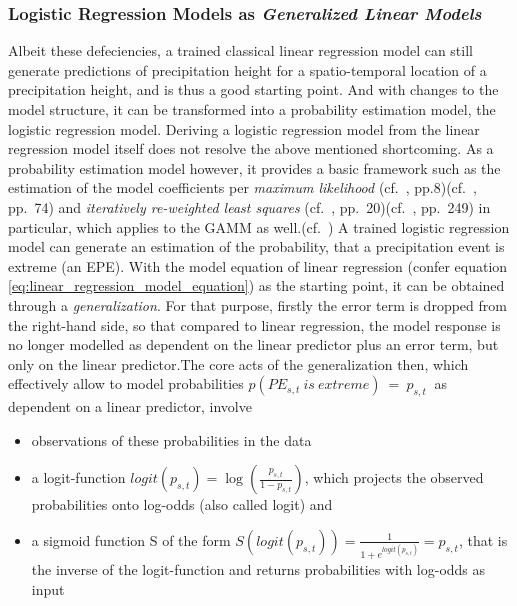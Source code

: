 \documentclass[
  12pt,
]{article}
\begin{document}
\endgroup

\hypertarget{logistic-regression-models-as}{%
\subsubsection{\texorpdfstring{Logistic Regression Models as
\textit{Generalized Linear Models}}{Logistic Regression Models as }}\label{logistic-regression-models-as}}

\begingroup
\justify

Albeit these defeciencies, a trained classical linear regression model
can still generate predictions of precipitation height for a
spatio-temporal location of a precipitation height, and is thus a good
starting point. And with changes to the model structure, it can be
transformed into a probability estimation model, the logistic regression
model. Deriving a logistic regression model from the linear regression
model itself does not resolve the above mentioned shortcoming. As a
probability estimation model however, it provides a basic framework such
as the estimation of the model coefficients per
\textit{maximum likelihood} (cf.~\cite{Hosmer.2013},
pp.8)(cf.~\cite{Wood.2017}, pp.~74) and
\textit{iteratively re-weighted least squares} (cf.~\cite{Hosmer.2013},
pp.~20)(cf.~\cite{Wood.2017}, pp.~249) in particular, which applies to
the GAMM as well.\newline (cf.~\cite{Hosmer.2013}) A trained logistic
regression model can generate an estimation of the probability, that a
precipitation event is extreme (an EPE). With the model equation of
linear regression (confer equation
\ref{eq:linear_regression_model_equation}) as the starting point, it can
be obtained through a \textit{generalization}. For that purpose, firstly
the error term is dropped from the right-hand side, so that compared to
linear regression, the model response is no longer modelled as dependent
on the linear predictor plus an error term, but only on the linear
predictor.\newline The core acts of the generalization then, which
effectively allow to model probabilities
\(p(PE_{s,t}\:is\:extreme)\:=\:p_{s,t}\:\) as dependent on a linear
predictor, involve\newline \endgroup \vspace{-0.75cm}

\begin{itemize}
\item observations of these probabilities in the data
\item a logit-function $logit(p_{s,t}) = \log\left(\frac{p_{s,t}}{1-p_{s,t}}\right)$, which projects the observed probabilities onto log-odds (also called logit) and
\item a sigmoid function S of the form $S\left(logit(p_{s,t})\right)=\frac{1}{1 + e^{logit\left(p_{s,t}\right)}}=p_{s,t}$, that is the inverse of the logit-function and returns probabilities with log-odds as input
\end{itemize}
\vspace{-0.5cm}
\begingroup
\justify
\end{document}
